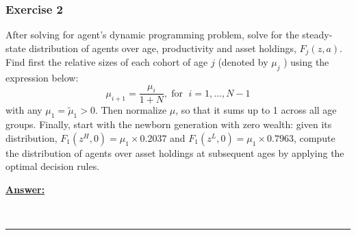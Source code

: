 \documentclass{article} %
\theoremstyle{definition}
\newenvironment{solution}[1][Answer]{\begin{singlespace}\underline{\textbf{#1:}}\quad }{\ \rule{0.3em}{0.3em}\end{singlespace}} %
\begin{document}
	\subsubsection*{Exercise 2}
	After solving for agent's dynamic programming problem, solve for the steady-state distribution of agents over age, productivity and asset holdings, $ F_j (z, a) $. Find first the relative sizes of each cohort of age $ j $ (denoted by $ \mu_j $ ) using the expression below: \[ \mu_{i+1} = \frac{\mu_i}{1 +N}, \; \text{for } \; i = 1, \hdots, N-1  \]  with any $ \mu_1 = \tilde{\mu}_1 >0 $. Then normalize $ \mu $, so that it sums up to 1 across all age groups. Finally, start with the newborn generation with zero wealth: given its distribution, $ F_1(z^H, 0) = \mu_1 × 0.2037 $ and $ F_1(z^L, 0) = \mu_1×0.7963 $, compute the distribution of agents over asset holdings at subsequent ages by applying the optimal decision rules.
	\begin{solution}
		
	\end{solution}
\end{document}
